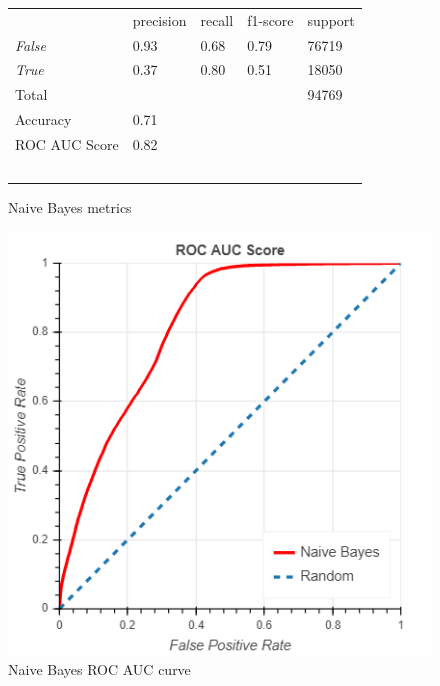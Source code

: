 \documentclass[10pt, conference, compsocconf]{IEEEtran}
\begin{document}
\begin{figure}
  \begin{tabular}{lllll}
                  & precision & recall      & f1-score  & support \\
  \textit{False}  & 0.93      & 0.68        & 0.79      & 76719 \\
  \textit{True}   & 0.37      & 0.80        & 0.51      & 18050 \\
  Total			      &           &             &           & 94769 \\
  Accuracy        & 0.71 \\
  ROC AUC Score	  & 0.82 \\\
  \end{tabular}
  \caption{Naive Bayes metrics}
  \label{fig:naive_bayes_metrics}
\end{figure}

\begin{figure}
  \includegraphics[scale=0.45]{naive_bayes_roc}
  \centering
  \caption{Naive Bayes ROC AUC curve}
  \label{fig:naive_bayes_roc}
\end{figure}
\end{document}
